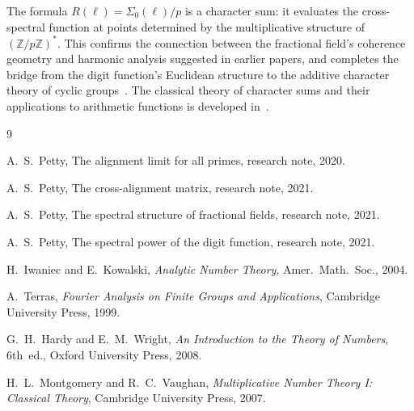 \documentclass[12pt]{amsart}
\theoremstyle{definition}
\theoremstyle{remark}
\begin{document}
The formula $R(\ell) = \Sigma_0(\ell)/p$ is a character sum: it
evaluates the cross-spectral function at points determined by the
multiplicative structure of $(\mathbb{Z}/p\mathbb{Z})^{*}$.
This confirms the connection between the fractional field's
coherence geometry and harmonic analysis suggested in earlier
papers, and completes the bridge from the digit function's
Euclidean structure to the additive character theory of cyclic
groups~\cite{terras}.  The classical theory of character sums and
their applications to arithmetic functions is developed
in~\cite{hardy,montgomery}.

\begin{thebibliography}{9}

A.~S.~Petty,
The alignment limit for all primes,
research note, 2020.

A.~S.~Petty,
The cross-alignment matrix,
research note, 2021.

A.~S.~Petty,
The spectral structure of fractional fields,
research note, 2021.

A.~S.~Petty,
The spectral power of the digit function,
research note, 2021.

H.~Iwaniec and E.~Kowalski,
\emph{Analytic Number Theory},
Amer.\ Math.\ Soc., 2004.

A.~Terras,
\emph{Fourier Analysis on Finite Groups and Applications},
Cambridge University Press, 1999.

G.~H.~Hardy and E.~M.~Wright,
\emph{An Introduction to the Theory of Numbers},
6th~ed., Oxford University Press, 2008.

H.~L.~Montgomery and R.~C.~Vaughan,
\emph{Multiplicative Number Theory I: Classical Theory},
Cambridge University Press, 2007.

\end{thebibliography}
\end{document}
